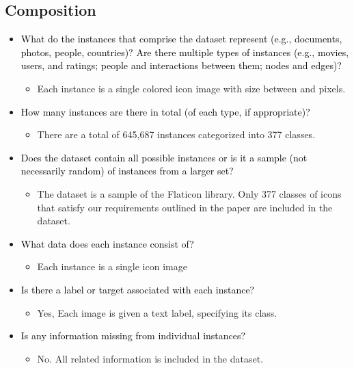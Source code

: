 \documentclass{article}
\newcommand{\ques}[1]{\textcolor{black}{#1}}
\begin{document}
\subsection{Composition}

\begin{itemize}
    \item \ques{What do the instances that comprise the dataset represent (e.g.,
documents, photos, people, countries)? Are there multiple types of
instances (e.g., movies, users, and ratings; people and interactions between them; nodes and edges)?}
    \begin{itemize}
        \item Each instance is a single colored icon image with size between  and  pixels.
    \end{itemize}
    \item \ques{How many instances are there in total (of each type, if appropriate)?}
    \begin{itemize}
        \item There are a total of 645,687 instances categorized into 377 classes.
    \end{itemize}
    \item \ques{Does the dataset contain all possible instances or is it a sample
(not necessarily random) of instances from a larger set?}
    \begin{itemize}
        \item The dataset is a sample of the Flaticon library. Only 377 classes of icons that satisfy our requirements outlined in the paper are included in the dataset.
    \end{itemize}
    \item \ques{What data does each instance consist of? }
    \begin{itemize}
        \item Each instance is a single icon image
    \end{itemize}
    \item \ques{Is there a label or target associated with each instance?}
    \begin{itemize}
        \item Yes, Each image is given a text label, specifying its class.
    \end{itemize}
    \item \ques{Is any information missing from individual instances?}
    \begin{itemize}
        \item No. All related information is included in the dataset.

\end{itemize}
\end{itemize}
\end{document}
